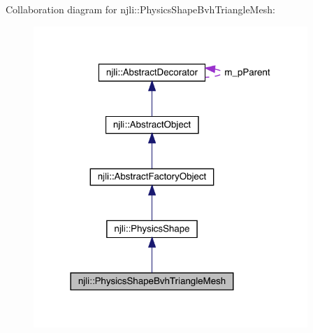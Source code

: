 Collaboration diagram for njli\+:\+:Physics\+Shape\+Bvh\+Triangle\+Mesh\+:\nopagebreak
\begin{figure}[H]
\begin{center}
\leavevmode
\includegraphics[width=294pt]{classnjli_1_1_physics_shape_bvh_triangle_mesh__coll__graph}
\end{center}
\end{figure}

